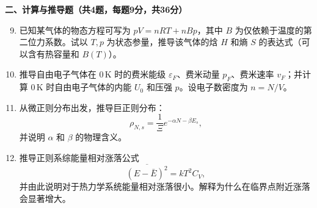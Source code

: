 \documentclass[12pt,a4paper,fontset=mac]{ctexart}
\newcommand{\đ}{\mathrm{đ}}
\begin{document}
\newpage

\noindent\textbf{二、计算与推导题（共4题，每题9分，共36分）}

\begin{enumerate}
\setcounter{enumi}{8}
\item 已知某气体的物态方程可写为 $pV = nRT + nBp$，其中 $B$ 为仅依赖于温度的第二位力系数。试以 $T,p$ 为状态参量，推导该气体的焓 $H$ 和熵 $S$ 的表达式（可以含有热容量和 $B(T)$）。

\item 推导自由电子气体在 $0\,\text{K}$ 时的费米能级 $\varepsilon_F$、费米动量 $p_F$、费米速率 $v_F$；并计算 $0\,\text{K}$ 时自由电子气体的内能 $U_0$ 和压强 $p$。设电子数密度为 $n = N/V$。

\item 从微正则分布出发，推导巨正则分布：
\[
\rho_{N,s} = \frac{1}{\Xi}e^{-\alpha N - \beta E_s},
\]
并说明 $\alpha$ 和 $\beta$ 的物理含义。

\item 推导正则系综能量相对涨落公式
\[
\overline{(E - \bar{E})^2} = kT^2 C_V,
\]
并由此说明对于热力学系统能量相对涨落很小。解释为什么在临界点附近涨落会显著增大。
\end{enumerate}
\end{document}
